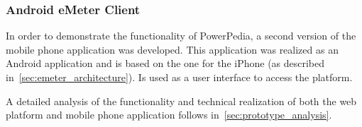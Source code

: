 \subsubsection{Android eMeter Client}
In order to demonstrate the functionality of PowerPedia, a second version of the mobile phone application was developed. This application was realized as an Android application and is based on the one for the iPhone (as described in~\ref{sec:emeter_architecture}). Is used as a user interface to access the platform.

A detailed analysis of the functionality and technical realization of both the web platform and mobile phone application follows in~\ref{sec:prototype_analysis}.